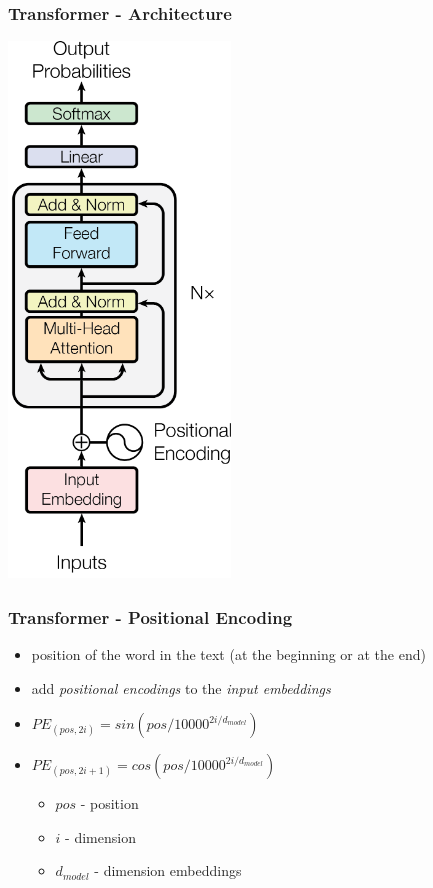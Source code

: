 \documentclass{beamer}
\begin{document}
\begin{frame}
    \frametitle{Transformer - Architecture}
    \begin{center}
        \includegraphics[scale=1.4]{img/transformer_lm.png}
    \end{center}
\end{frame}

\begin{frame}
    \frametitle{Transformer - Positional Encoding}
    \begin{itemize}
    	\item position of the word in the text (at the beginning or at the end)
    	\item add \textit{positional encodings} to the \textit{input embeddings}
        \item $ PE_{(pos, 2i)} = sin(pos / 10000^{2i/d_{model}} ) $
        \item $ PE_{(pos, 2i+1)} = cos(pos / 10000^{2i/d_{model}} ) $
        \begin{itemize}
        	\item $ pos $ - position
        	\item $ i $ - dimension 
        	\item $ d_{model} $ - dimension embeddings
        \end{itemize}
    \end{itemize}
\end{frame}
\end{document}
